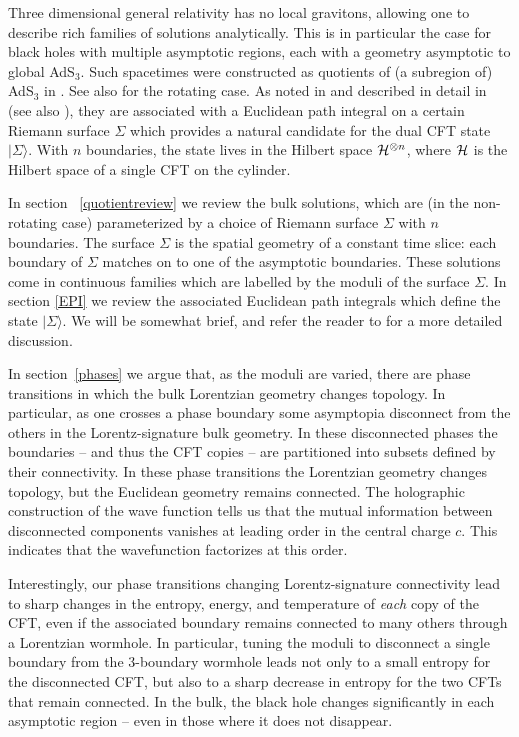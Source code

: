 \documentclass[12pt]{article}
\numberwithin{equation}{section}
\begin{document}
Three dimensional general relativity has no local gravitons, allowing one to describe rich families of solutions analytically. This is in particular the case for black holes with multiple asymptotic regions, each with a geometry asymptotic to global AdS$_3$. Such spacetimes were constructed as quotients of (a subregion of) AdS$_3$ in \cite{Brill:1995jv,Aminneborg:1997pz,Brill:1998pr}.  See also \cite{Aminneborg:1998si} for the rotating case.  As noted in \cite{Maldacena:2001kr} and described in detail in \cite{Skenderis:2009ju} (see also \cite{Krasnov:2000zq, Krasnov:2003ye}), they are associated with a Euclidean path integral on a certain Riemann surface $\Sigma$ which provides a natural candidate for the dual CFT state $|\Sigma\rangle$.  With $n$ boundaries, the state lives in the Hilbert space ${\cal H}^{\otimes n}$, where ${\cal H}$ is the Hilbert space of a single CFT on the cylinder.

In section ~\ref{quotientreview} we review the bulk solutions, which are (in the non-rotating case) parameterized by a choice of Riemann surface $\Sigma$ with $n$ boundaries.  The surface $\Sigma$ is the spatial geometry of a constant time slice: each boundary of $\Sigma$ matches on to one of the asymptotic boundaries.  These solutions come in continuous families which are labelled by the moduli of the surface $\Sigma$.  In section \ref{EPI} we review the associated  Euclidean path integrals which define the state $|\Sigma\rangle$. We will be somewhat brief, and refer the reader to \cite{Krasnov:2000zq, Skenderis:2009ju} for a more detailed discussion.

In section~\ref{phases} we argue that, as the moduli are varied, there are phase transitions in which the bulk Lorentzian geometry changes topology.
In particular, as one crosses a phase boundary some asymptopia disconnect from the others in the Lorentz-signature bulk geometry.   In these disconnected phases the boundaries -- and thus the CFT copies -- are partitioned into subsets defined by their connectivity. In these phase transitions the Lorentzian geometry changes topology, but the Euclidean
geometry remains connected.
 The holographic construction of the wave function tells us that the mutual information between disconnected components vanishes at leading order in the central charge $c$.  This indicates that the wavefunction factorizes at this order.

Interestingly, our phase transitions changing Lorentz-signature connectivity lead to
sharp changes in the entropy, energy, and temperature of {\it each} copy of the CFT, even if the associated boundary remains connected to many others through a Lorentzian wormhole.
In particular, tuning the moduli to disconnect a single boundary from the 3-boundary wormhole leads not only to a small entropy for the disconnected CFT, but also to a sharp decrease in entropy for the two CFTs that remain connected.  In the bulk, the black hole changes significantly in each asymptotic region -- even in those where it does not disappear.
\end{document}
